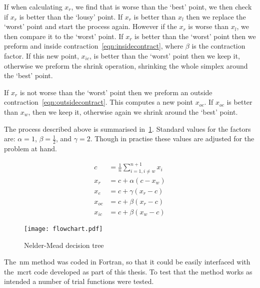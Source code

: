 If when calculating $x_r$, we find that is worse than the `best' point, we then check if $x_r$ is better than the `lousy' point.
If $x_r$ is better than $x_l$ then we replace the `worst' point and start the process again.
However if the $x_r$ is worse than $x_l$, we then compare it to the `worst' point.
If $x_r$ is better than the `worst' point then we preform and inside contraction~\cref{eqn:insidecontract}, where $\beta$ is the contraction factor.
If this new point, $x_{ic}$, is better than the `worst' point then we keep it, otherwise we preform the shrink operation, shrinking the whole simplex around the `best' point.

If $x_r$ is not worse than the `worst' point then we preform an outside contraction~\cref{eqn:outsidecontract}.
This computes a new point $x_{oc}$.
If $x_{oc}$ is better than $x_w$, then we keep it, otherwise again we shrink around the `best' point.

The process described above is summarised in~\cref{fig:NM-algo}.
Standard values for the factors are: $\alpha=1$, $\beta=\frac{1}{2}$, and $\gamma=2$.
Though in practise these values are adjusted for the problem at hand.

\begin{align}
c &= \frac{1}{n}\sum \limits_{i=1,i\neq w}^{n+1} x_i \label{eqn:centroid}\\
x_r &= c + \alpha(c - x_w)\label{eqn:reflect}\\
x_e &= c + \gamma(x_r - c)\label{eqn:expand}\\
x_{oc} &= c + \beta(x_r - c)\label{eqn:outsidecontract}\\
x_{ic} &= c + \beta(x_w - c)\label{eqn:insidecontract}
\end{align}

\begin{figure}[!htbp]
    \centering
    \texttt{[image: flowchart.pdf]}
    \caption{Nelder-Mead decision tree}
    \label{fig:NM-algo}
\end{figure}


The~\gls*{nm} method was coded in Fortran, so that it could be easily interfaced with the~\gls*{mcrt} code developed as part of this thesis.
To test that the method works as intended a number of trial functions were tested.



